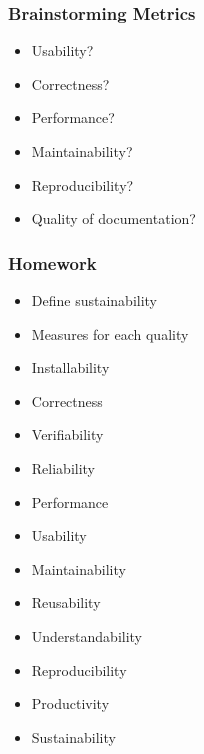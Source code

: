 \documentclass[t,12pt,numbers,fleqn]{beamer}
\begin{document}

\begin{frame}
\frametitle{Brainstorming Metrics}

\begin{itemize}
\item Usability?
\item Correctness?
\item Performance?
\item Maintainability?
\item Reproducibility?
\item Quality of documentation?
\end{itemize}

\end{frame}


\begin{frame}
\frametitle{Homework}

\begin{itemize}
\item Define sustainability
\item Measures for each quality
\bi
\item Installability
\item Correctness
\item Verifiability
\item Reliability
\item Performance
\item Usability
\item Maintainability
\item Reusability
\item Understandability
\item Reproducibility
\item Productivity
\item Sustainability
\ei
\end{itemize}

\end{frame}

\end{document}
